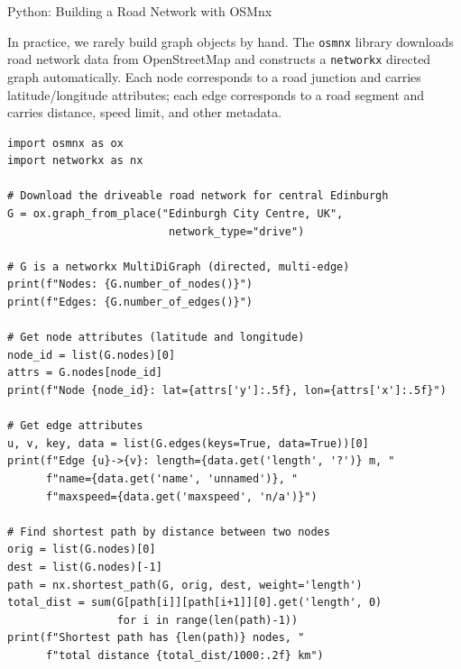 \documentclass[aspectratio=169,10pt]{beamer}
\begin{document}
\begin{frame}[fragile]{Python: Building a Road Network with OSMnx}

  In practice, we rarely build graph objects by hand.  The
  \texttt{osmnx} library downloads road network data from
  OpenStreetMap and constructs a \texttt{networkx} directed graph
  automatically.  Each node corresponds to a road junction
  and carries latitude/longitude attributes; each edge corresponds
  to a road segment and carries distance, speed limit, and other
  metadata.

\begin{lstlisting}[caption={Building and querying an OSM road network graph}]
import osmnx as ox
import networkx as nx

# Download the driveable road network for central Edinburgh
G = ox.graph_from_place("Edinburgh City Centre, UK",
                         network_type="drive")

# G is a networkx MultiDiGraph (directed, multi-edge)
print(f"Nodes: {G.number_of_nodes()}")
print(f"Edges: {G.number_of_edges()}")

# Get node attributes (latitude and longitude)
node_id = list(G.nodes)[0]
attrs = G.nodes[node_id]
print(f"Node {node_id}: lat={attrs['y']:.5f}, lon={attrs['x']:.5f}")

# Get edge attributes
u, v, key, data = list(G.edges(keys=True, data=True))[0]
print(f"Edge {u}->{v}: length={data.get('length', '?')} m, "
      f"name={data.get('name', 'unnamed')}, "
      f"maxspeed={data.get('maxspeed', 'n/a')}")

# Find shortest path by distance between two nodes
orig = list(G.nodes)[0]
dest = list(G.nodes)[-1]
path = nx.shortest_path(G, orig, dest, weight='length')
total_dist = sum(G[path[i]][path[i+1]][0].get('length', 0)
                 for i in range(len(path)-1))
print(f"Shortest path has {len(path)} nodes, "
      f"total distance {total_dist/1000:.2f} km")
\end{lstlisting}

\end{frame}
\end{document}
